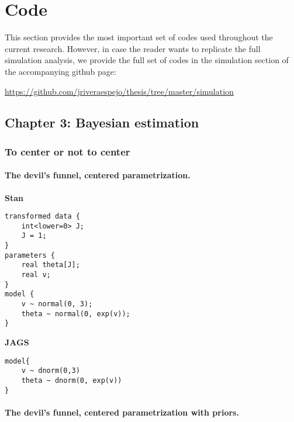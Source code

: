 \chapter{Code} \label{appC:additional}

This section provides the most important set of codes used throughout the current research. However, in case the reader wants to replicate the full simulation analysis, we provide the full set of codes in the simulation section of the accompanying github page:

\noindent \url{https://github.com/jriveraespejo/thesis/tree/master/simulation} \\


\section{Chapter 3: Bayesian estimation} \label{appC1:chapter3}

\subsection{To center or not to center} \label{appC1_1:noncenter}

\subsubsection{The devil's funnel, centered parametrization.} 

\noindent \textbf{Stan}
%
\begin{lstlisting}
transformed data {
	int<lower=0> J;
	J = 1;
}
parameters {
	real theta[J];
	real v;
}
model {
	v ~ normal(0, 3);
	theta ~ normal(0, exp(v));
}
\end{lstlisting}


\noindent \textbf{JAGS}
%
\begin{lstlisting}
model{
	v ~ dnorm(0,3)
	theta ~ dnorm(0, exp(v))
}
\end{lstlisting}




\subsubsection{The devil's funnel, centered parametrization with priors.} 

